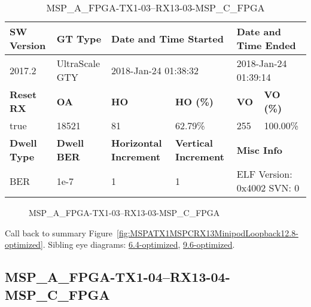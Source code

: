 \begin{table}[h]
\centering
\caption{MSP\_A\_FPGA-TX1-03--RX13-03-MSP\_C\_FPGA}
\label{tab:MSPAFPGATX103RX1303MSPCFPGA12.8-optimized}
\begin{tabular}{@{}|l|l|l|l|l|l|@{}}
\toprule
\textbf{SW Version}                & \textbf{GT Type}   & \multicolumn{2}{l|}{\textbf{Date and Time Started}}            & \multicolumn{2}{l|}{\textbf{Date and Time Ended}}        \\ \midrule
2017.2                       & UltraScale GTY          & \multicolumn{2}{l|}{2018-Jan-24 01:38:32}                   & \multicolumn{2}{l|}{2018-Jan-24 01:39:14}               \\ \midrule
\textbf{Reset RX}                  & \textbf{OA} & \textbf{HO}   & \textbf{HO (\%)} & \textbf{VO} & \textbf{VO (\%)} \\ \midrule
true & 18521        & 81          & 62.79\%        & 255        & 100.00\%       \\ \midrule
\textbf{Dwell Type}                & \textbf{Dwell BER} & \textbf{Horizontal Increment} & \textbf{Vertical Increment}    & \multicolumn{2}{l|}{\textbf{Misc Info}}                  \\ \midrule
BER                            & 1e-7        & 1        & 1           & \multicolumn{2}{l|}{ELF Version: 0x4002 SVN: 0}                         \\ \bottomrule
\end{tabular}
\end{table}

\begin{figure}[h]
\caption{MSP\_A\_FPGA-TX1-03--RX13-03-MSP\_C\_FPGA} \label{fig:MSPAFPGATX103RX1303MSPCFPGA12.8-optimized}
\end{figure}

Call back to summary Figure~\ref{fig:MSPATX1MSPCRX13MinipodLoopback12.8-optimized}.
Sibling eye diagrams: \hyperref[sec:MSPAFPGATX103RX1303MSPCFPGA6.4-optimized]{6.4-optimized}, \hyperref[sec:MSPAFPGATX103RX1303MSPCFPGA9.6-optimized]{9.6-optimized}.

\clearpage
\newpage


\subsection{MSP\_A\_FPGA-TX1-04--RX13-04-MSP\_C\_FPGA}\label{sec:MSPAFPGATX104RX1304MSPCFPGA12.8-optimized}

